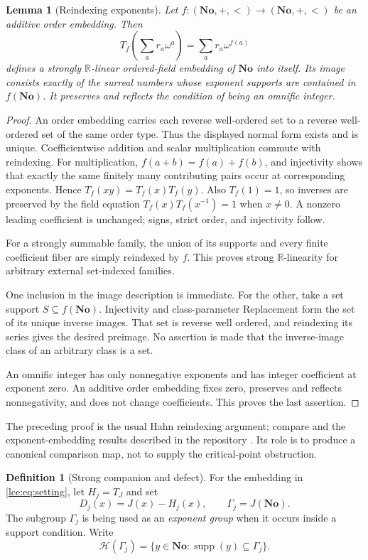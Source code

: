 \documentclass[11pt,letterpaper]{article}
\numberwithin{equation}{section}
\newtheorem{lemma}[theorem]{Lemma}
\theoremstyle{definition}
\newtheorem{definition}[theorem]{Definition}
\theoremstyle{remark}
\newcommand{\No}{\mathbf{No}}
\newcommand{\R}{\mathbb R}
\newcommand{\supp}{\operatorname{supp}}
\newcommand{\Gam}{\Gamma_j}
\begin{document}
\begin{lemma}[Reindexing exponents]\label{lce:lem:reindex}
Let $f:(\No,+,<)\to(\No,+,<)$ be an additive order embedding. Then
\[
 T_f\left(\sum_a r_a\omega^a\right)=\sum_a r_a\omega^{f(a)}
\]
defines a strongly $\R$-linear ordered-field embedding of $\No$ into itself.
Its image consists exactly of the surreal numbers whose exponent supports
are contained in $f(\No)$. It preserves and reflects the condition of being
an omnific integer.
\end{lemma}
\begin{proof}
An order embedding carries each reverse well-ordered set to a reverse
well-ordered set of the same order type. Thus the displayed normal form
exists and is unique. Coefficientwise addition and scalar multiplication
commute with reindexing. For multiplication, $f(a+b)=f(a)+f(b)$, and
injectivity shows that exactly the same finitely many contributing pairs
occur at corresponding exponents. Hence $T_f(xy)=T_f(x)T_f(y)$. Also
$T_f(1)=1$, so inverses are preserved by the field equation
$T_f(x)T_f(x^{-1})=1$ when $x\ne0$. A nonzero leading coefficient is
unchanged; signs, strict order, and injectivity follow.

For a strongly summable family, the union of its supports and every finite
coefficient fiber are simply reindexed by $f$. This proves strong
$\R$-linearity for arbitrary external set-indexed families.

One inclusion in the image description is immediate. For the other, take a
set support $S\subseteq f(\No)$. Injectivity and class-parameter Replacement
form the set of its unique inverse images. That set is reverse well ordered,
and reindexing its series gives the desired preimage. No assertion is made
that the inverse-image class of an arbitrary class is a set.

An omnific integer has only nonnegative exponents and has integer
coefficient at exponent zero. An additive order embedding fixes zero,
preserves and reflects nonnegativity, and does not change coefficients.
This proves the last assertion.
\end{proof}

The preceding proof is the usual Hahn reindexing argument; compare
\cite{vdDE,KKS} and the exponent-embedding results described in the
repository \cite{Repo}. Its role is to produce a canonical comparison map,
not to supply the critical-point obstruction.

\begin{definition}[Strong companion and defect]\label{lce:def:companion}
For the embedding in \eqref{lce:eq:setting}, let $H_j=T_J$ and set
\[
 D_j(x)=J(x)-H_j(x),\qquad \Gam=J(\No).
\]
The subgroup $\Gam$ is being used as an \emph{exponent group} when it
occurs inside a support condition. Write
\[
 \mathcal H(\Gam)=\{y\in\No:\supp(y)\subseteq\Gam\}.
\]
\end{definition}
\end{document}
